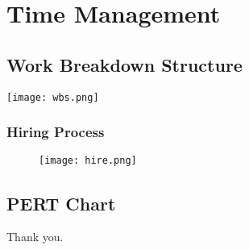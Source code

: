 \documentclass{beamer}
\begin{document}
\begin{frame}
\end{frame}

\section{Time Management}

\subsection{Work Breakdown Structure}

\begin{frame}
  \texttt{[image: wbs.png]}
\end{frame}

\begin{frame}
  \frametitle{Hiring Process}
  \begin{figure}
    \texttt{[image: hire.png]}
  \end{figure}
\end{frame}

\subsection{PERT Chart}

\begin{frame}
\end{frame}

\begin{frame}[t]{Thank you.}
\end{frame}
\end{document}
